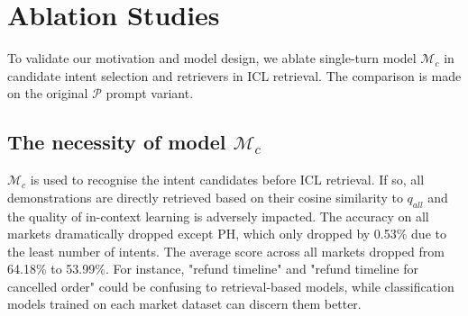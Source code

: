 \begin{table}[t!]
\centering
{}
\caption{Performance of LARA using different encoders for in-context demonstration mining. The best performance for each dataset is in bold, while the second best is underlined.}
\label{table:results_encoder}
\vspace{-0.3cm}
\end{table}

\section{Ablation Studies}
To validate our motivation and model design, we ablate single-turn model $\mathcal{M}_c$ in candidate intent selection and retrievers in ICL retrieval. The comparison is made on the original $\mathcal{P}$ prompt variant.

\subsection{The necessity of model $\mathcal{M}_c$}
$\mathcal{M}_c$ is used to recognise the intent candidates before ICL retrieval. If so, all demonstrations are directly retrieved based on their cosine similarity to $q_{all}$ and the quality of in-context learning is adversely impacted. The accuracy on all markets dramatically dropped except PH, which only dropped by 0.53\% due to the least number of intents. The average score across all markets dropped from 64.18\% to 53.99\%. For instance, "refund timeline" and "refund timeline for cancelled order" could be confusing to retrieval-based models, while classification models trained on each market dataset can discern them better.


